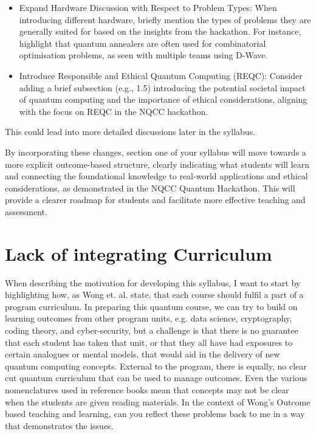 \documentclass[11pt,a4paper]{article}
\begin{document}
\begin{itemize}
	\item Expand Hardware Discussion with Respect to Problem Types: When introducing different hardware, briefly mention the types of problems they are generally suited for based on the insights from the hackathon. For instance, highlight that quantum annealers are often used for combinatorial optimisation problems, as seen with multiple teams using D-Wave.
	
	\item Introduce Responsible and Ethical Quantum Computing (REQC): Consider adding a brief subsection (e.g., 1.5) introducing the potential societal impact of quantum computing and the importance of ethical considerations, aligning with the focus on REQC in the NQCC hackathon. 
\end{itemize}

	
	This could lead into more detailed discussions later in the syllabus.
	
By incorporating these changes, section one of your syllabus will move towards a more explicit outcome-based structure, clearly indicating what students will learn and connecting the foundational knowledge to real-world applications and ethical considerations, as demonstrated in the NQCC Quantum Hackathon. This will provide a clearer roadmap for students and facilitate more effective teaching and assessment.

\section{Lack of integrating Curriculum}

When describing the motivation for developing this syllabus, I want to start by highlighting how, as Wong et. al. state, that each course should fulfil a part of a program curriculum.  In preparing this quantum course, we can try to build on learning outcomes from other program units, e.g. data science, cryptography, coding theory, and cyber-security, but a challenge is that there is no guarantee that each student has taken that unit, or that they all have had exposures to certain analogues or mental models, that would aid in the delivery of new quantum computing concepts.  External to the program, there is equally, no clear cut quantum curriculum that can be used to manage outcomes.  Even the various nomenclatures used in reference books mean that concepts may not be clear when the students are given reading materials.   In the context of Wong's Outcome based teaching and learning, can you reflect these problems back to me in a way that demonstrates the issues.
\end{document}
